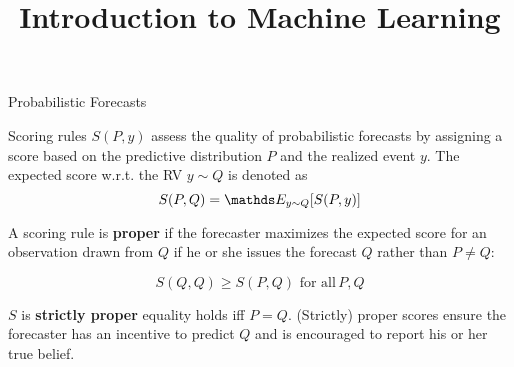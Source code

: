 \documentclass[11pt,compress,t,notes=noshow, xcolor=table]{beamer}
\title{Introduction to Machine Learning}
\begin{document}
    

\begin{vbframe}{Probabilistic Forecasts }

Scoring rules $S(P,y)$ assess the quality of probabilistic forecasts by assigning a score based on the predictive distribution $P$ and the realized event $y$. The expected score w.r.t. the RV $y \sim Q$ is denoted as 
$$ S(P,Q) = \E_{y \sim Q}[S(P,y)]$$



A scoring rule is \textbf{proper} if the forecaster maximizes the expected score for an observation drawn from $Q$ if he or she issues the forecast $Q$ rather than $P \neq Q$:

$$S(Q,Q) \geq S(P,Q) \,\, \text{for all} \, P,Q $$

\vspace{0.3cm}

$S$ is \textbf{strictly proper} equality holds iff $P=Q$. (Strictly) proper scores ensure the forecaster has an incentive to predict $Q$ and is encouraged to report his or her true belief.

\end{vbframe}
\end{document}
